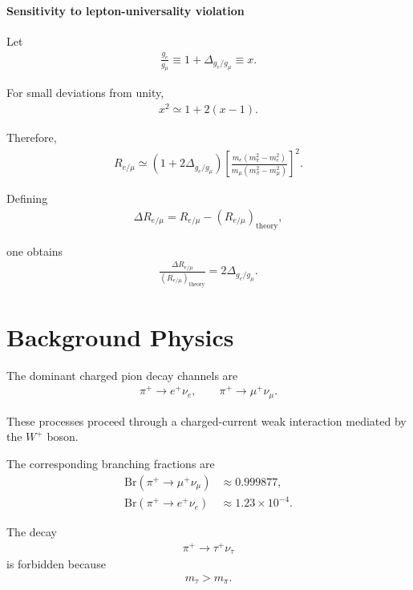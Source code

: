 \paragraph{Sensitivity to lepton-universality violation}

Let
\begin{align}
\frac{g_e}{g_\mu}
\equiv
1+\Delta_{g_e/g_\mu}
\equiv x .
\end{align}

For small deviations from unity,
\begin{align}
x^2
\simeq
1+2(x-1).
\end{align}

Therefore,
\begin{align}
R_{e/\mu}
\simeq
\left(1+2\Delta_{g_e/g_\mu}\right)
\left[
\frac{
m_e(m_\pi^2-m_e^2)
}{
m_\mu(m_\pi^2-m_\mu^2)
}
\right]^2 .
\end{align}

Defining
\begin{align}
\Delta R_{e/\mu}
=
R_{e/\mu}
-
\left(R_{e/\mu}\right)_{\mathrm{theory}},
\end{align}

one obtains
\begin{align}
\frac{
\Delta R_{e/\mu}
}{
\left(R_{e/\mu}\right)_{\mathrm{theory}}
}
=
2\Delta_{g_e/g_\mu}.
\end{align}

\section{Background Physics}

The dominant charged pion decay channels are
\begin{align}
\pi^+ \to e^+ \nu_e,
\qquad
\pi^+ \to \mu^+ \nu_\mu .
\end{align}

These processes proceed through a charged-current weak interaction mediated by the \(W^+\) boson.

The corresponding branching fractions are
\begin{align}
\mathrm{Br}(\pi^+ \to \mu^+ \nu_\mu)
&\approx 0.999877,
\\
\mathrm{Br}(\pi^+ \to e^+ \nu_e)
&\approx 1.23\times10^{-4}.
\end{align}

The decay
\begin{align}
\pi^+ \to \tau^+ \nu_\tau
\end{align}
is forbidden because
\begin{align}
m_\tau > m_\pi .
\end{align}

